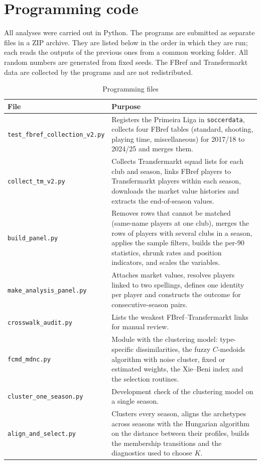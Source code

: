 \chapter{Programming code}
\label{app:code}

All analyses were carried out in Python. The programs are submitted as separate files in a ZIP archive. They are listed below in the order in which they are run; each reads the outputs of the previous ones from a common working folder. All random numbers are generated from fixed seeds. The FBref and Transfermarkt data are collected by the programs and are not redistributed.

\begin{table}[ht]
	\centering
	\footnotesize
	\caption{Programming files}
	\label{tab:code}
	\begin{tabular}{p{4.6cm}p{10.2cm}}
		\toprule
		File & Purpose \\
		\midrule
		\texttt{test\_fbref\_collection\_v2.py} & Registers the Primeira Liga in \texttt{soccerdata}, collects four FBref tables (standard, shooting, playing time, miscellaneous) for 2017/18 to 2024/25 and merges them. \\
		\texttt{collect\_tm\_v2.py} & Collects Transfermarkt squad lists for each club and season, links FBref players to Transfermarkt players within each season, downloads the market value histories and extracts the end-of-season values. \\
		\texttt{build\_panel.py} & Removes rows that cannot be matched (same-name players at one club), merges the rows of players with several clubs in a season, applies the sample filters, builds the per-90 statistics, shrunk rates and position indicators, and scales the variables. \\
		\texttt{make\_analysis\_panel.py} & Attaches market values, resolves players linked to two spellings, defines one identity per player and constructs the outcome for consecutive-season pairs. \\
		\texttt{crosswalk\_audit.py} & Lists the weakest FBref--Transfermarkt links for manual review. \\
		\texttt{fcmd\_mdnc.py} & Module with the clustering model: type-specific dissimilarities, the fuzzy $C$-medoids algorithm with noise cluster, fixed or estimated weights, the Xie--Beni index and the selection routines. \\
		\texttt{cluster\_one\_season.py} & Development check of the clustering model on a single season. \\
		\texttt{align\_and\_select.py} & Clusters every season, aligns the archetypes across seasons with the Hungarian algorithm on the distance between their profiles, builds the membership transitions and the diagnostics used to choose $K$. \\

\end{tabular}
\end{table}
